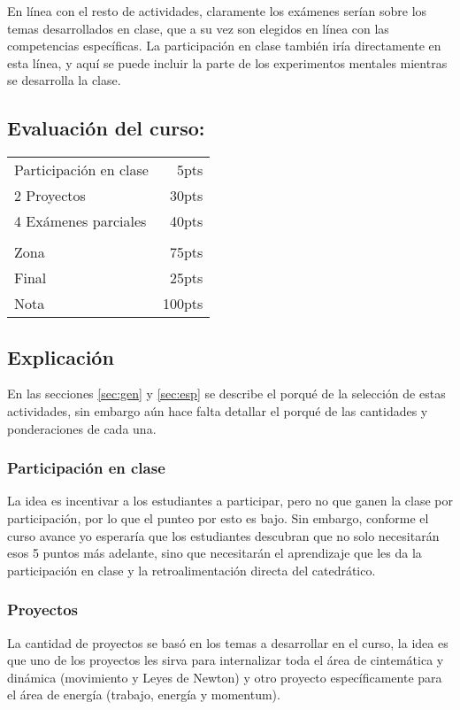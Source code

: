 En línea con el resto de actividades, claramente los exámenes serían sobre los temas desarrollados en clase, que a su vez son elegidos en línea con las competencias específicas. La participación en clase también iría directamente en esta línea, y aquí se puede incluir la parte de los experimentos mentales mientras se desarrolla la clase.

\subsection{Evaluación del curso:}

\begin{table}[H]
    \centering
    \begin{tabular}{|lr|}
        \hline
        Participación en clase & 5pts\\
        2 Proyectos & 30pts\\
        4 Exámenes parciales & 40pts\\
        &\\
        Zona & 75pts\\
        Final &25pts\\
        \hline\hline
        Nota & 100pts\\
        \hline
    \end{tabular}
\end{table}


\subsection{Explicación}
En las secciones \ref{sec:gen} y \ref{sec:esp} se describe el porqué de la selección de estas actividades, sin embargo aún hace falta detallar el porqué de las cantidades y ponderaciones de cada una.

\subsubsection{Participación en clase}
La idea es incentivar a los estudiantes a participar, pero no que ganen la clase por participación, por lo que el punteo por esto es bajo. Sin embargo, conforme el curso avance yo esperaría que los estudiantes descubran que no solo necesitarán esos 5 puntos más adelante, sino que necesitarán el aprendizaje que les da la participación en clase y la retroalimentación directa del catedrático.

\subsubsection{Proyectos}
La cantidad de proyectos se basó en los temas a desarrollar en el curso, la idea es que uno de los proyectos les sirva para internalizar toda el área de cintemática y dinámica (movimiento y Leyes de Newton) y otro proyecto específicamente para el área de energía (trabajo, energía y momentum).


